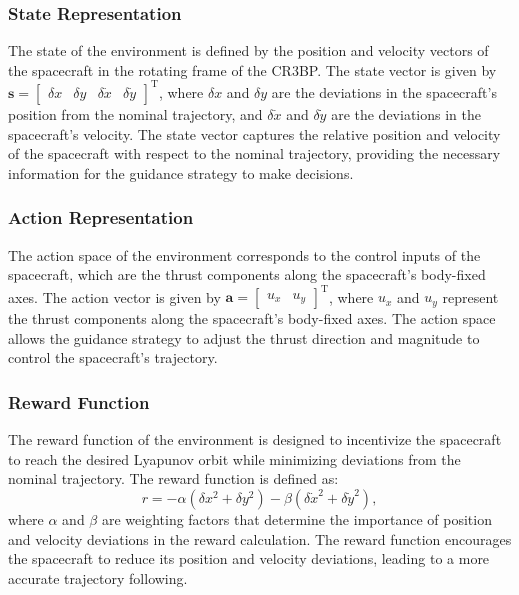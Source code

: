 \documentclass[conference]{IEEEtran}
\begin{document}
\subsubsection{State Representation}
The state of the environment is defined by the position and velocity vectors of the spacecraft in the rotating frame of the CR3BP. The state vector is given by \( \boldsymbol{s} = \begin{bmatrix}
	\delta x & \delta y & \delta \dot{x} & \delta \dot{y}
\end{bmatrix}^\mathrm{T} \), where \( \delta x \) and \( \delta y \) are the deviations in the spacecraft's position from the nominal trajectory, and \( \delta \dot{x} \) and \( \delta \dot{y} \) are the deviations in the spacecraft's velocity. The state vector captures the relative position and velocity of the spacecraft with respect to the nominal trajectory, providing the necessary information for the guidance strategy to make decisions.
\subsubsection{Action Representation}
The action space of the environment corresponds to the control inputs of the spacecraft, which are the thrust components along the spacecraft's body-fixed axes. The action vector is given by \( \boldsymbol{a} = \begin{bmatrix}
	u_x & u_y
\end{bmatrix}^\mathrm{T} \), where \( u_x \) and \( u_y \) represent the thrust components along the spacecraft's body-fixed axes. The action space allows the guidance strategy to adjust the thrust direction and magnitude to control the spacecraft's trajectory.
\subsubsection{Reward Function}
The reward function of the environment is designed to incentivize the spacecraft to reach the desired Lyapunov orbit while minimizing deviations from the nominal trajectory. The reward function is defined as:
\begin{equation}
	r = -\alpha \left( \delta x^2 + \delta y^2 \right) - \beta \left( \delta \dot{x}^2 + \delta \dot{y}^2 \right),
\end{equation}
where \( \alpha \) and \( \beta \) are weighting factors that determine the importance of position and velocity deviations in the reward calculation. The reward function encourages the spacecraft to reduce its position and velocity deviations, leading to a more accurate trajectory following.
\end{document}
